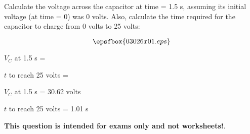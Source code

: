 

Calculate the voltage across the capacitor at time = 1.5 s, assuming its initial voltage (at time = 0) was 0 volts.  Also, calculate the time required for the capacitor to charge from 0 volts to 25 volts:

$$\epsfbox{03026x01.eps}$$

$V_C$ at 1.5 s = 

\vskip 10pt

$t$ to reach 25 volts = 







$V_C$ at 1.5 s = 30.62 volts

\vskip 10pt

$t$ to reach 25 volts = 1.01 s







{\bf This question is intended for exams only and not worksheets!}.




